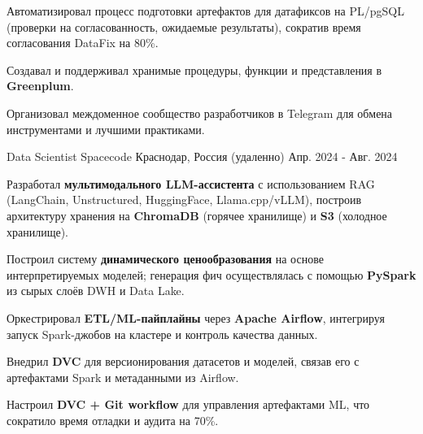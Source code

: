 \begin{cventries}
{\begin{cvitems}
        \item {Автоматизировал процесс подготовки артефактов для датафиксов на PL/pgSQL (проверки на согласованность, ожидаемые результаты), сократив время согласования DataFix на 80\%.}
        \item {Создавал и поддерживал хранимые процедуры, функции и представления в \textbf{Greenplum}.}
        \item {Организовал междоменное сообщество разработчиков в Telegram для обмена инструментами и лучшими практиками.}
      \end{cvitems}
    }


  \cventry
    {Data Scientist} %
    {Spacecode} %
    {Краснодар, Россия (удаленно)} %
    {Апр. 2024 - Авг. 2024} %
    {
      \begin{cvitems}
        \item {Разработал \textbf{мультимодального LLM-ассистента} с использованием RAG (LangChain, Unstructured, HuggingFace, Llama.cpp/vLLM), построив архитектуру хранения на \textbf{ChromaDB} (горячее хранилище) и \textbf{S3} (холодное хранилище).}
        \item {Построил систему \textbf{динамического ценообразования} на основе интерпретируемых моделей; генерация фич осуществлялась с помощью \textbf{PySpark} из сырых слоёв DWH и Data Lake.}
        \item {Оркестрировал \textbf{ETL/ML-пайплайны} через \textbf{Apache Airflow}, интегрируя запуск Spark-джобов на кластере и контроль качества данных.}
        \item {Внедрил \textbf{DVC} для версионирования датасетов и моделей, связав его с артефактами Spark и метаданными из Airflow.}
        \item {Настроил \textbf{DVC + Git workflow} для управления артефактами ML, что сократило время отладки и аудита на 70\%.}
      \end{cvitems}
    }



\end{cventries}
